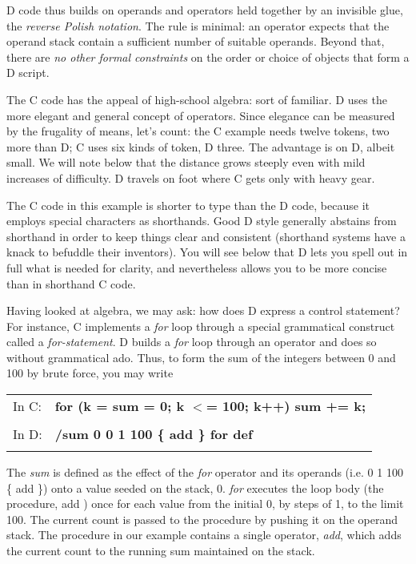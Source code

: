 \noindent D  code  thus  builds  on operands and operators  held  together  by  an invisible  glue,  the \emph{reverse Polish notation}.  The rule is  minimal:  an operator  expects that the operand stack contain a sufficient  number  of suitable operands.  Beyond that, there are \emph{no other formal constraints} on the order or choice of objects that form a D script.

The C code has the appeal of high-school algebra:  sort of  familiar.  D uses  the more elegant and general  concept  of  operators.  Since elegance can be measured by the frugality of means,  let's count:  the  C example needs twelve tokens,  two more than D; C uses six kinds of token, D three. The advantage is on D, albeit small. We will note below that the distance grows steeply even with mild increases of difficulty.  D travels on foot where C gets only with heavy gear.

The C code in this example is shorter to type than the D  code,  because it  employs  special characters as shorthands.  Good  D  style  generally abstains  from  shorthand in order to keep things  clear  and  consistent (shorthand  systems have a knack to befuddle their inventors).  You  will see  below that D lets you spell out in full what is needed for  clarity, and nevertheless allows you to be more concise than in shorthand C code.

Having  looked  at algebra,  we may ask:  how does D express  a  control statement?  For  instance,  C implements a \emph{for} loop through  a  special grammatical  construct called a \emph{for-statement}.  D builds a  \emph{for}  loop through an operator and does so without grammatical ado.  Thus,  to  form the sum of the integers between 0 and 100 by brute force, you may write\\

\begin{tabular}{>{\normalfont}l>{\sffamily\bfseries}l}

In C: & for (k = sum = 0; k $<$= 100; k++)  sum += k;\\\\

In D: & /sum 0   0 1 100 \{ add \} for   def\\\\

\end{tabular}

\noindent The  \emph{sum}  is  defined  as the effect of the  \emph{for}  operator  and  its operands  (i.e.  0 1 100 \{ add \}) onto a value seeded on the  stack,  0. \emph{for} executes  the loop body (the procedure,  { add }) once  for  each value from the initial 0,  by steps of 1,  to the limit 100.  The current count is passed to the procedure by pushing it on the operand stack.  The procedure in our example contains a single operator,  \emph{add},  which  adds the current count to the running sum maintained on the stack.

